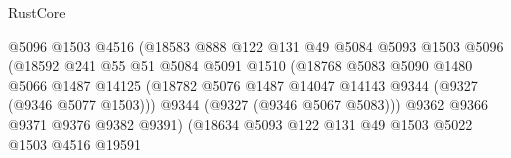 \begin{lexlean}{RustCore}
\begin{coremodule}
                                        @5096
                                        @1503
                                        @4516
                                        (@18583
                                          @888
                                          @122
                                          @131
                                          @49
                                          @5084
                                          @5093
                                          @1503
                                          @5096
                                          (@18592
                                            @241
                                            @55
                                            @51
                                            @5084
                                            @5091
                                            @1510
                                            (@18768
                                              @5083
                                              @5090
                                              @1480
                                              @5066
                                              @1487
                                              @14125
                                              (@18782
                                                @5076
                                                @1487
                                                @14047
                                                @14143
                                                @9344
                                                (@9327 (@9346 @5077 @1503)))
                                              @9344
                                              (@9327 (@9346 @5067 @5083)))
                                            @9362
                                            @9366
                                            @9371
                                            @9376
                                            @9382
                                            @9391)
                                          (@18634
                                            @5093
                                            @122
                                            @131
                                            @49
                                            @1503
                                            @5022
                                            @1503
                                            @4516
                                            @19591

\end{coremodule}
\end{lexlean}
